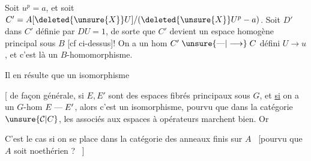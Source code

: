 
Soit $u^p=a$, et soit $C'=A[\deleted{\unsure{X}}U]/(\deleted{\unsure{X}}U^p-a)$.  Soit $D'$  dans $C'$ définie par $DU=1$, de sorte que $C'$ devient un espace homogène principal sous $B$ [cf ci-dessus]!
On a un hom  $C'\mathrel{\unsure{\text{\textemdash}|\longrightarrow}}C$ défini $U\longrightarrow u$, et  c'est là un $B$-homomorphisme.

Il en résulte que   un isomorphisme

[ de façon générale, si $E,E'$ sont des espaces fibrés principaux sous $G$, et \uline{si} on a un $G$-hom $E\mathrel{\text{\textemdash}}E'$, alors  c'est un isomorphisme, pourvu que dans la catégorie $\unsure{\mathcal C|C}$, les  associés aux espaces à opérateurs marchent bien. Or

C'est le cas si on se place dans la catégorie des anneaux finis sur $A$ \textendash\ [pourvu que $A$ soit noethérien ? \textendash\ ]
